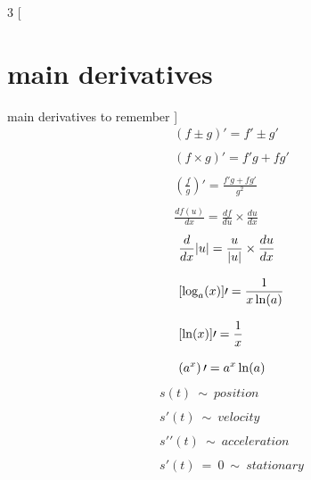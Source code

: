 \documentclass{article}
\begin{document}
\setlength{\columnsep}{0.3cm}
\begin{multicols}{3}
    [
    \section{main derivatives}
    main derivatives to remember 
    ]
    \[
    \begin{array}{l}
        ( f\pm g) \prime =f\prime \pm g\prime \\
        \\
        ( f\times g) \prime =f\prime g+fg\prime \\
        \\
        \displaystyle   
        \left(\frac{f}{g}\right) \prime =\frac{f\prime g+fg\prime }{g^{2}} \\
        \\
        \displaystyle   
        \frac{df( u)}{dx} =\frac{df}{du} \times \frac{du}{dx}
    \end{array}
    \]
    \vspace*{\fill}
    \columnbreak
    \vspace*{\fill}
    \[
    \begin{array}{l}
        \displaystyle
        \frac{d}{dx} |u|=\frac{u}{|u|} \times \frac{du}{dx}\\
        \\
        \displaystyle 
        [\log_{a}( x)] \prime =\frac{1}{x\ln( a)}\\
        \\\relax
        \displaystyle 
        [\ln( x)] \prime =\frac{1}{x}\\
        \\
        \displaystyle 
        \left( a^{x}\right)\prime    =a^{x}\ln( a)
    \end{array}
    \]
    \vspace*{\fill}
    \columnbreak
    \vspace*{\fill}
    \[
    \begin{array}{l}
        s( t) \ \sim \ position\ \\
        \\
        s\prime ( t) \ \sim \ velocity\ \\  
        \\
        s\prime \prime ( t) \ \sim \ acceleration\\
        \\
        s\prime ( t) \ =\ 0\ \sim \ stationary\\
        \\

\end{array}\]
\end{multicols}
\end{document}
